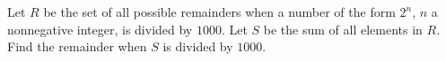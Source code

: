Let $R$ be the set of all possible remainders when a number of the form $2^n$, $n$ a nonnegative integer, is divided by $1000$. Let $S$ be the sum of all elements in $R$. Find the remainder when $S$ is divided by $1000$.